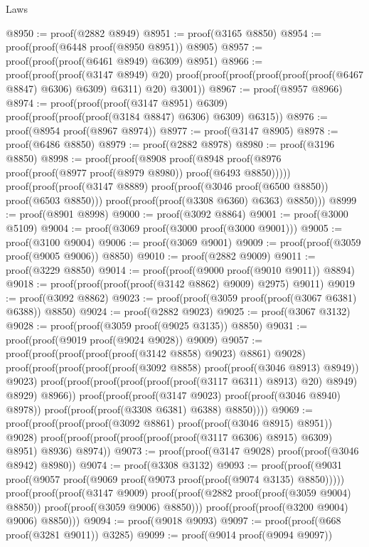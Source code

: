 \begin{lexlean}{Laws}
\begin{coremodule}
@8950 := proof(@2882 @8949)
@8951 := proof(@3165 @8850)
@8954 := proof(proof(@6448 proof(@8950 @8951)) @8905)
@8957 := proof(proof(proof(@6461 @8949) @6309) @8951)
@8966 := proof(proof(proof(@3147 @8949) @20)
      proof(proof(proof(proof(proof(proof(@6467 @8847) @6306) @6309) @6311) @20) @3001))
@8967 := proof(@8957 @8966)
@8974 := proof(proof(proof(@3147 @8951) @6309)
      proof(proof(proof(proof(@3184 @8847) @6306) @6309) @6315))
@8976 := proof(@8954 proof(@8967 @8974))
@8977 := proof(@3147 @8905)
@8978 := proof(@6486 @8850)
@8979 := proof(@2882 @8978)
@8980 := proof(@3196 @8850)
@8998 := proof(proof(@8908
        proof(@8948 proof(@8976 proof(proof(@8977 proof(@8979 @8980)) proof(@6493 @8850)))))
      proof(proof(proof(@3147 @8889) proof(proof(@3046 proof(@6500 @8850)) proof(@6503 @8850)))
          proof(proof(proof(@3308 @6360) @6363) @8850)))
@8999 := proof(@8901 @8998)
@9000 := proof(@3092 @8864)
@9001 := proof(@3000 @5109)
@9004 := proof(@3069 proof(@3000 proof(@3000 @9001)))
@9005 := proof(@3100 @9004)
@9006 := proof(@3069 @9001)
@9009 := proof(proof(@3059 proof(@9005 @9006)) @8850)
@9010 := proof(@2882 @9009)
@9011 := proof(@3229 @8850)
@9014 := proof(proof(@9000 proof(@9010 @9011)) @8894)
@9018 := proof(proof(proof(proof(@3142 @8862) @9009) @2975) @9011)
@9019 := proof(@3092 @8862)
@9023 := proof(proof(@3059 proof(proof(@3067 @6381) @6388)) @8850)
@9024 := proof(@2882 @9023)
@9025 := proof(@3067 @3132)
@9028 := proof(proof(@3059 proof(@9025 @3135)) @8850)
@9031 := proof(proof(@9019 proof(@9024 @9028)) @9009)
@9057 := proof(proof(proof(proof(proof(@3142 @8858) @9023) @8861) @9028)
      proof(proof(proof(proof(proof(@3092 @8858) proof(proof(@3046 @8913) @8949)) @9023)
            proof(proof(proof(proof(proof(proof(@3117 @6311) @8913) @20) @8949) @8929) @8966))
          proof(proof(proof(@3147 @9023) proof(proof(@3046 @8940) @8978))
              proof(proof(proof(@3308 @6381) @6388) @8850))))
@9069 := proof(proof(proof(proof(@3092 @8861) proof(proof(@3046 @8915) @8951)) @9028)
      proof(proof(proof(proof(proof(proof(@3117 @6306) @8915) @6309) @8951) @8936) @8974))
@9073 := proof(proof(@3147 @9028) proof(proof(@3046 @8942) @8980))
@9074 := proof(@3308 @3132)
@9093 := proof(proof(@9031 proof(@9057 proof(@9069 proof(@9073 proof(proof(@9074 @3135) @8850)))))
      proof(proof(proof(@3147 @9009)
            proof(proof(@2882 proof(proof(@3059 @9004) @8850)) proof(proof(@3059 @9006) @8850)))
          proof(proof(proof(@3200 @9004) @9006) @8850)))
@9094 := proof(@9018 @9093)
@9097 := proof(proof(@668 proof(@3281 @9011)) @3285)
@9099 := proof(@9014 proof(@9094 @9097))

\end{coremodule}
\end{lexlean}
